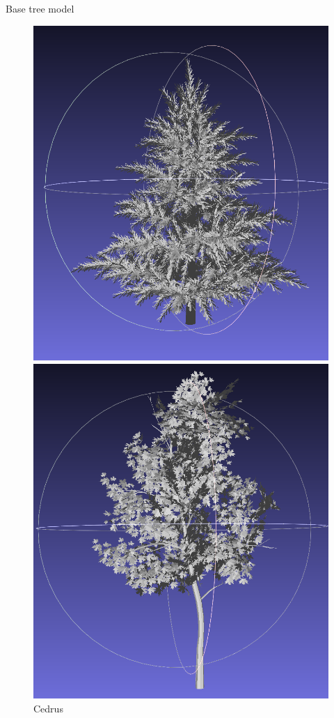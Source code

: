 \documentclass[12pt]{beamer}
\begin{document}
\begin{frame}{Base tree model}
\begin{figure}[H]
    \centering
    \begin{minipage}{0.24\textwidth}
        \centering
        \includegraphics[width=\textwidth]{images/cedrus.png}
        \caption{Cedrus}
    \end{minipage}\hfill
    \begin{minipage}{0.24\textwidth}
        \centering
        \includegraphics[width=\textwidth]{images/liquidanbar.png}

\end{minipage}
\end{figure}
\end{frame}
\end{document}
